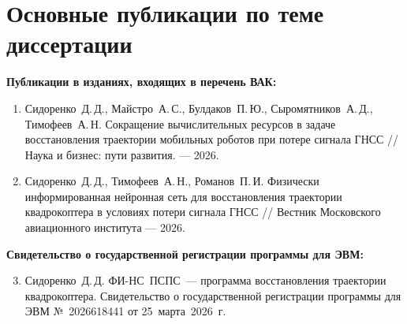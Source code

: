 \section{Основные публикации по теме диссертации}

\textbf{Публикации в изданиях, входящих в перечень ВАК:}

\begin{enumerate}
	\item Сидоренко~Д.\,Д., Майстро~А.\,С., Булдаков~П.\,Ю.,
	Сыромятников~А.\,Д., Тимофеев~А.\,Н.
	Сокращение вычислительных ресурсов в задаче восстановления траектории
	мобильных роботов при потере сигнала ГНСС
	// Наука и бизнес: пути развития. --- 2026.
	
	\item Сидоренко~Д.\,Д., Тимофеев~А.\,Н., Романов~П.\,И.
	Физически информированная нейронная сеть для восстановления траектории
	квадрокоптера в условиях потери сигнала ГНСС
	// Вестник  Московского авиационного института --- 2026.
\end{enumerate}

\textbf{Свидетельство о государственной регистрации программы для ЭВМ:}

\begin{enumerate}
	\setcounter{enumi}{2}
	\item Сидоренко~Д.\,Д. ФИ-НС~ПСПС~--- программа восстановления траектории
	квадрокоптера. Свидетельство о государственной регистрации программы для ЭВМ
	№~2026618441 от 25~марта~2026~г.
\end{enumerate}